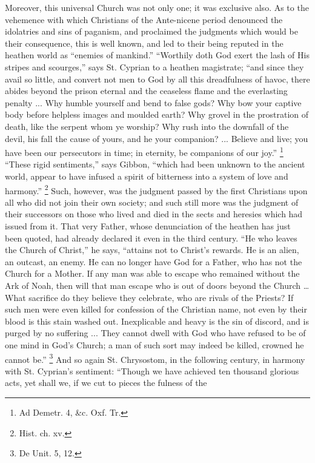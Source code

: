 Moreover, this universal Church was not only one; it
was exclusive also. As to the vehemence with which
Christians of the Ante-nicene period denounced the
idolatries and sins of paganism, and proclaimed the
judgments which would be their consequence, this is well
known, and led to their being reputed in the heathen
world as ``enemies of mankind.'' ``Worthily
doth God exert the lash of His stripes and
scourges,'' says St. Cyprian to a heathen magistrate;
``and since they avail so little, and convert not men
to God by all this dreadfulness of havoc, there abides
beyond the prison eternal and the ceaseless flame and the
everlasting penalty ... Why humble yourself and bend to
false gods? Why bow your captive body before helpless
images and moulded earth? Why grovel in the prostration
of death, like the serpent whom ye worship? Why rush into
the downfall of the devil, his fall the cause of yours,
and he your companion? ... Believe and live; you have
been our persecutors in time; in eternity, be companions
of our joy.'' \footnote{Ad Demetr. 4, \&c. Oxf.
Tr.} ``These rigid
sentiments,'' says Gibbon, ``which had been
unknown to the ancient world, appear to have infused a
spirit of bitterness into a system of love and
harmony.'' \footnote{Hist. ch. xv.} Such, however, was the judgment passed by the
first Christians upon all who did not join their own
society; and such still more was the judgment of their
successors on those who lived and died in the sects and
heresies which had issued from it. That very Father,
whose denunciation of the heathen has just been quoted, had already declared it even in the third century.
``He who leaves the Church of Christ,'' he says,
``attains not to Christ's rewards. He is an alien, an
outcast, an enemy. He can no longer have God for a
Father, who has not the Church for a Mother. If any man
was able to escape who remained without the Ark of Noah,
then will that man escape who is out of doors beyond the
Church … What sacrifice do they believe they
celebrate, who are rivals of the Priests? If such men
were even killed for confession of the Christian name,
not even by their blood is this stain washed out.
Inexplicable and heavy is the sin of discord, and is
purged by no suffering ... They cannot dwell with God who
have refused to be of one mind in God's Church; a man of
such sort may indeed be killed, crowned he cannot
be.'' \footnote{De Unit. 5, 12.} And so again St. Chrysostom, in the following
century, in harmony with St. Cyprian's sentiment:
``Though we have achieved ten thousand glorious acts,
yet shall we, if we cut to pieces the fulness of the

